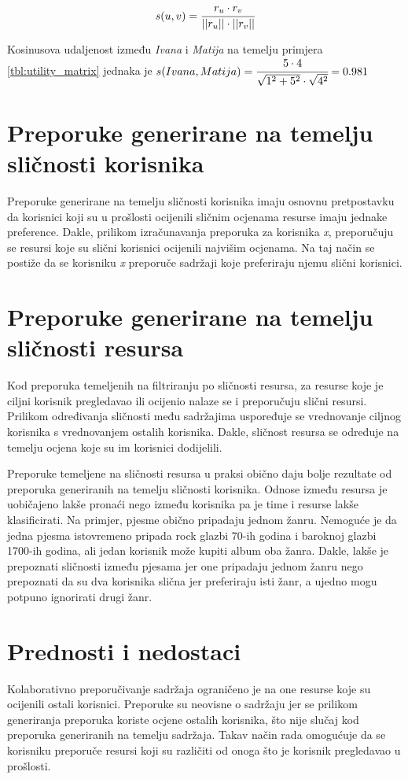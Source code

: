 \documentclass[times, utf8, seminar]{fer}
\begin{document}
\begin{equation}
	s(u, v) = \cfrac{r_u \cdot r_v}{||r_u||\cdot||r_v||}
\end{equation}

Kosinusova udaljenost između \textit{Ivana} i \textit{Matija} na temelju primjera \ref{tbl:utility_matrix} jednaka je $s(Ivana, Matija) = \cfrac{5 \cdot 4}{\sqrt{1^2 + 5^2} \cdot \sqrt{4^2}} = 0.981$

\section{Preporuke generirane na temelju sličnosti korisnika}
Preporuke generirane na temelju sličnosti korisnika imaju osnovnu pretpostavku da korisnici koji su u prošlosti ocijenili sličnim ocjenama resurse imaju jednake preference. Dakle, prilikom izračunavanja preporuka za korisnika \textit{x}, preporučuju se resursi koje su slični korisnici ocijenili najvišim ocjenama. Na taj način se postiže da se korisniku \textit{x} preporuče sadržaji koje preferiraju njemu slični korisnici.

\section{Preporuke generirane na temelju sličnosti resursa}
Kod preporuka temeljenih na filtriranju po sličnosti resursa, za resurse koje je ciljni korisnik pregledavao ili ocijenio nalaze se i preporučuju slični resursi. Prilikom određivanja sličnosti među sadržajima uspoređuje se vrednovanje ciljnog korisnika s vrednovanjem ostalih korisnika. Dakle, sličnost resursa se određuje na temelju ocjena koje su im korisnici dodijelili.

Preporuke temeljene na sličnosti resursa u praksi obično daju bolje rezultate od preporuka generiranih na temelju sličnosti korisnika. Odnose između resursa je uobičajeno lakše pronaći nego između korisnika pa je time i resurse lakše klasificirati. Na primjer, pjesme obično pripadaju jednom žanru. Nemoguće je da jedna pjesma istovremeno pripada rock glazbi 70-ih godina i baroknoj glazbi 1700-ih godina, ali jedan korisnik može kupiti album oba žanra. Dakle, lakše je prepoznati sličnosti između pjesama jer one pripadaju jednom žanru nego prepoznati da su dva korisnika slična jer preferiraju isti žanr, a ujedno mogu potpuno ignorirati drugi žanr.

\section{Prednosti i nedostaci}
Kolaborativno preporučivanje sadržaja ograničeno je na one resurse koje su ocijenili ostali korisnici. Preporuke su neovisne o sadržaju jer se prilikom generiranja preporuka koriste ocjene ostalih korisnika, što nije slučaj kod preporuka generiranih na temelju sadržaja. Takav način rada omogućuje da se korisniku preporuče resursi koji su različiti od onoga što je korisnik pregledavao u prošlosti. 
\end{document}
